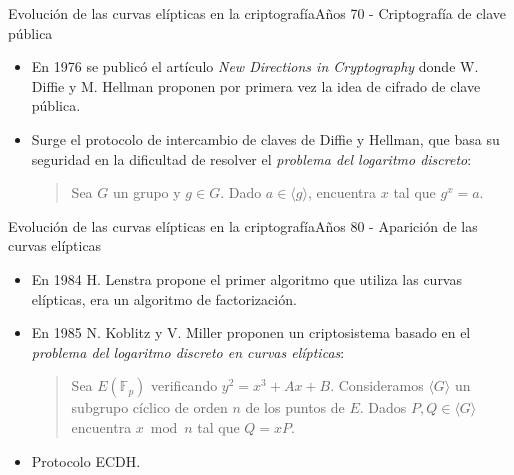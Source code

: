 \documentclass[spanish]{beamer}
\begin{document}
\begin{frame}[fragile]{Evolución de las curvas elípticas en la criptografía}{Años 70 - Criptografía de clave pública}
  \begin{itemize}
  \item En 1976 se publicó el artículo \textit{New Directions in Cryptography} donde W. Diffie y M. Hellman proponen por primera vez la idea de cifrado de clave pública. %
  \item Surge el protocolo de intercambio de claves de Diffie y Hellman, que basa su seguridad en la dificultad de resolver el \textit{problema del logaritmo discreto}:

  \begin{quote}
    \vspace{1em}
    Sea \(G\) un grupo y $g \in G$. Dado \(a \in \langle g \rangle\), encuentra \(x\) tal que \(g^x = a\). %
\end{quote}
  \end{itemize}
\end{frame}

\begin{frame}[fragile]{Evolución de las curvas elípticas en la criptografía}{Años 80 - Aparición de las curvas elípticas}
  \begin{itemize}
    \item En 1984 H. Lenstra propone el primer algoritmo que utiliza las curvas elípticas, era un algoritmo de factorización.
    \item En 1985 N. Koblitz y V. Miller proponen un criptosistema basado en el \textit{problema del logaritmo discreto en curvas elípticas}:

    \begin{quote}
      \vspace{.5em}
      Sea $E(\mathbb{F}_p)$ verificando $y^2 =x^3 + Ax + B$. Consideramos $\langle G \rangle$ un subgrupo cíclico de orden $n$ de los puntos de $E$. Dados $P,Q \in \langle G \rangle$ encuentra $x \bmod{n}$ tal que $Q=xP$.
      \vspace{.5em}
      \end{quote}
    \item Protocolo ECDH.
  \end{itemize}
\end{frame}
\end{document}
